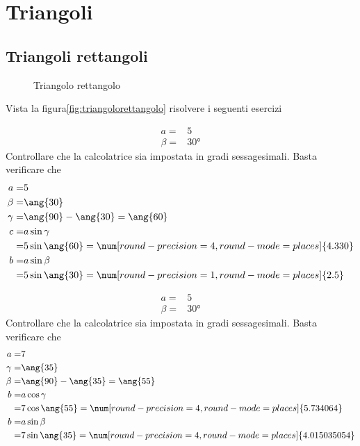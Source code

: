 \chapter{Triangoli}
\label{cha:trigonometriatriangoli}
 \section{Triangoli rettangoli}
\begin{figure}
	\centering
	
	\caption{Triangolo rettangolo}
	\label{fig:triangolorettangolo}
\end{figure}
Vista la figura\nobs\vref{fig:triangolorettangolo} risolvere i seguenti esercizi
 \begin{exercise}
 	\begin{align*}
 	a=&5\\
 	\beta=&\ang{30}
 	\end{align*}
\tcblower
Controllare che la calcolatrice sia impostata in gradi sessagesimali.
Basta verificare che \testgradi 
\begin{align*}
a=&5\\
\beta=&\ang{30}\\
\gamma=&\ang{90}-\ang{30}=\ang{60}\\
c=&a\sin\gamma\\
=& 5\sin\ang{60}=\num[round-precision=\lungarrotandamento,round-mode=places]{4.330}\\
b=&a\sin\beta\\
=& 5\sin\ang{30}=\num[round-precision=1,round-mode=places]{2.5}
\end{align*}
 \end{exercise}
 
  \begin{exercise}
  	\begin{align*}
  	a=&5\\
  	\beta=&\ang{30}
  	\end{align*}
  	\tcblower
  	Controllare che la calcolatrice sia impostata in gradi sessagesimali.
  	Basta verificare che \testgradi 
  	\begin{align*}
  	a=& 7\\
  	\gamma=&\ang{35}\\
  	\beta=&\ang{90}-\ang{35}=\ang{55}\\
  	b=&a\cos\gamma\\
  	=& 7\cos\ang{55}=\num[round-precision=\lungarrotandamento,round-mode=places]{5.734064}\\
  	b=&a\sin\beta\\
  	=& 7\sin\ang{35}=\num[round-precision=\lungarrotandamento,round-mode=places]{4.015035054}
  	\end{align*}
  \end{exercise}
